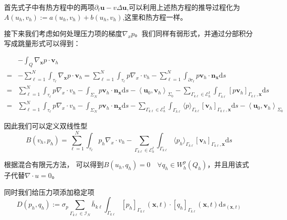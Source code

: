 首先式子中有热方程中的两项$\partial_{t} \boldsymbol{u}-v \Delta \boldsymbol{u}$,可以利用上述热方程的推导过程化为
$A\left(u_{h}, v_{h}\right):=a\left(u_{h}, v_{h}\right)+b\left(u_{h}, v_{h}\right)$,这里和热方程一样。

接下来我们考虑如何处理压力项的梯度$\nabla_x p$。我们同样有弱形式，并通过分部积分写成跳量形式可以得到：

$$\begin{aligned}
    &-\int_{Q} \nabla_{\boldsymbol{x}} p \cdot \boldsymbol{v}_{h}  \\=& -\sum_{\ell=1}^{N} \int_{\tau_{\ell}} \nabla_{\boldsymbol{x}} p \cdot \boldsymbol{v}_{h}  
    =  \sum_{\ell=1}^{N} \int_{\tau_{\ell}} p \nabla_x \cdot{v}_{h} -\sum_{\ell=1}^{N} \int_{\partial \tau_{\ell}} p \boldsymbol{v}_{h} \cdot \boldsymbol{n}_{\boldsymbol{x}} \mathrm{d} s\\
    = & \sum_{\ell=1}^{N} \int_{\tau_{\ell}} p \nabla_x \cdot{v}_{h} -\int_{\Sigma_{N}} p \boldsymbol{v}_{h} \cdot \boldsymbol{n}_{\boldsymbol{x}} \mathrm{d} s-\left\langle\boldsymbol{u}_{0}, \boldsymbol{v}_{h}\right\rangle_{\Sigma_{0}}
     -\sum_{\Gamma_{k \ell} \in \mathscr{E}_{h}^I} \int_{\Gamma_{k \ell}}\left[p \boldsymbol{v}_{h}\right]_{\Gamma_{k \ell}, \boldsymbol{x}} \mathrm{d} s\\
     = & \sum_{\ell=1}^{N} \int_{\tau_{\ell}} p \nabla_x \cdot{v}_{h} -\int_{\Sigma_{N}} p \boldsymbol{v}_{h} \cdot \boldsymbol{n}_{\boldsymbol{x}} \mathrm{d} s
     -\sum_{\Gamma_{k \ell} \in \mathscr{E}_{h}^I} \int_{\Gamma_{k \ell}}\langle p \rangle_{\Gamma_{k \ell}}[\boldsymbol{v}_{h}]_{\Gamma_{k \ell}, \boldsymbol{x}} \mathrm{d} s-\left\langle\boldsymbol{u}_{0}, \boldsymbol{v}_{h}\right\rangle_{\Sigma_{0}}
\end{aligned}$$

因此我们可以定义双线性型
$$B(v_h, p_h)=\sum_{\ell=1}^{N} \int_{\tau_{\ell}} p_h \nabla_x \cdot{v}_{h} -\sum_{\Gamma_{k \ell} \in \mathscr{E}_{h}^I} \int_{\Gamma_{k \ell}}\langle p_h \rangle_{\Gamma_{k \ell}}[\boldsymbol{v}_{h}]_{\Gamma_{k \ell}, \boldsymbol{x}} \mathrm{d} s$$

根据混合有限元方法， 可以得到$B(u_h, q_h)=0\quad \forall q_h\in W_{h}^{p}\left(Q_h\right)$，并且用该式子代替$\nabla \cdot u=0$。

同时我们给压力项添加稳定项
$$D\left(p_{h}, q_{h}\right):=\sigma_{p} \sum_{\Gamma_{k \ell} \in \mathcal{I}_{N}} \bar{h}_{k \ell} \int_{\Gamma_{k \ell}}\left[p_{h}\right]_{\Gamma_{k \ell}}(\boldsymbol{x}, t) \cdot\left[q_{h}\right]_{\Gamma_{k \ell}}(\boldsymbol{x}, t) \mathrm{d} s_{(\boldsymbol{x}, t)}$$

